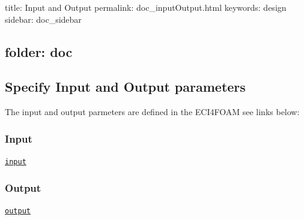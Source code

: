 

 title\+: Input and Output permalink\+: doc\+\_\+input\+Output.\+html keywords\+: design sidebar\+: doc\+\_\+sidebar \subsection*{folder\+: doc }

\subsection*{Specify Input and Output parameters}

The input and output parmeters are defined in the E\+C\+I4\+F\+O\+AM see links below\+: \subsubsection*{Input}

\href{https://dlr-ry.github.io/ECI4FOAM/doc_input.html}{\tt input}

\subsubsection*{Output}

\href{https://dlr-ry.github.io/ECI4FOAM/doc_output.html}{\tt output} 